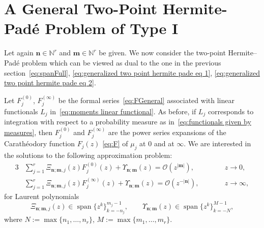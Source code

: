 \documentclass[reqno,centertags,11pt,draft]{amsart}
\newcommand{\N}{\mathbb{N}}
\newcommand{\abs}[1]{\left|#1\right|}
\newcommand{\set}[1]{\left\{#1\right\}}
\begin{document}


\section{A General Two-Point Hermite-Pad\'e Problem of Type I}\label{ss:HPI}

Let again $\bm{n}\in\N^r$ and $\bm{m}\in\N^r$ be given. %
We now consider the two-point Hermite--Pad\'e problem which can be viewed as dual to the one in the previous section~\eqref{eq:spanFull}, \eqref{eq:generalized two point hermite pade eq 1}, \eqref{eq:generalized two point hermite pade eq 2}. 

Let $F_j^{(0)}$, $F_j^{(\infty)}$ be the formal series~\eqref{eq:FGeneral} associated with linear functionals $L_j$ in~\eqref{eq:moments linear functional}. As before, if $L_j$ corresponds to integration with respect to a probability measure as in~\eqref{eq:functionals given by measures}, then $F_j^{(0)}$ and $F_j^{(\infty)}$ are the power series expansions of the Carath\'{e}odory function $F_j(z)$ \eqref{eq:F} of $\mu_j$ at $0$ and at $\infty$.
We are interested in the solutions to the following approximation problem:
\begin{alignat}{3}
\label{eq:HPtypeI1swapped}
    & \sum_{j = 1}^r \Xi_{\bm{n};\bm{m},j}(z)F^{(0)}_j(z) + \Upsilon_{\bm{n};\bm{m}}(z) = \mathcal{O}(z^{\abs{\bm{m}}}), \qquad && z \rightarrow 0, \\
\label{eq:HPtypeI2swapped}
    & \sum_{j = 1}^r \Xi_{\bm{n};\bm{m},j}(z)F_j^{(\infty)}(z) + \Upsilon_{\bm{n};\bm{m}}(z) = \mathcal{O}(z^{-\abs{\bm{n}}}), \qquad && z \rightarrow \infty,
\end{alignat}
for Laurent polynomials 
\begin{equation}
    \label{eq:HPtypeIspanSwapped}
    \Xi_{\bm{n};\bm{m},j}(z) \in \operatorname{span}\big\{z^{k}\big\}_{k=-n_j}^{m_j-1},
    \qquad
     \Upsilon_{\bm{n};\bm{m}}(z) \in \operatorname{span}\big\{z^{k}\big\}_{k=-N}^{M-1},
\end{equation}
where $N:=\max\{n_1,\ldots,n_r\}$, $M:=\max\{m_1,\ldots,m_r\}$.
\end{document}
